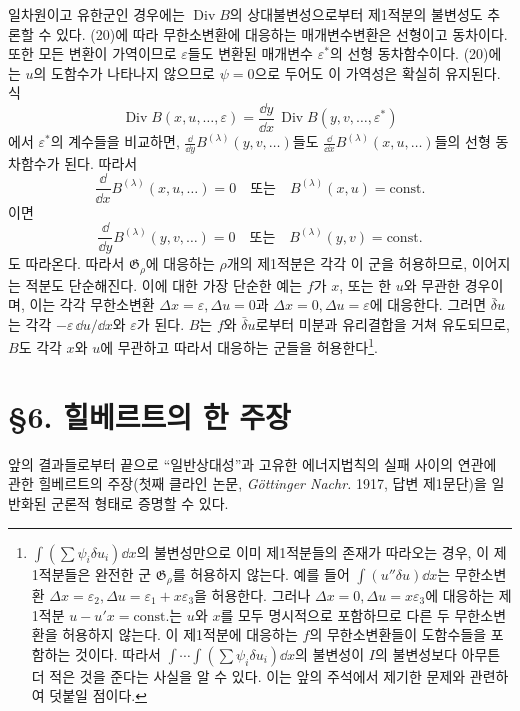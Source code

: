 일차원이고 유한군인 경우에는 \(\operatorname{Div}B\)의 상대불변성으로부터 제1적분의 불변성도 추론할 수 있다. (20)에 따라 무한소변환에 대응하는 매개변수변환은 선형이고 동차이다. 또한 모든 변환이 가역이므로 \(\varepsilon\)들도 변환된 매개변수 \(\varepsilon^*\)의 선형 동차함수이다. (20)에는 \(u\)의 도함수가 나타나지 않으므로 \(\psi=0\)으로 두어도 이 가역성은 확실히 유지된다. 식
\[
\operatorname{Div}B(x,u,\ldots,\varepsilon)
=\frac{\dd y}{\dd x}\,
\operatorname{Div}B(y,v,\ldots,\varepsilon^*)
\]
에서 \(\varepsilon^*\)의 계수들을 비교하면, \(\frac{\dd}{\dd y}B^{(\lambda)}(y,v,\ldots)\)들도 \(\frac{\dd}{\dd x}B^{(\lambda)}(x,u,\ldots)\)들의 선형 동차함수가 된다. 따라서
\[
\frac{\dd}{\dd x}B^{(\lambda)}(x,u,\ldots)=0
\quad\text{또는}\quad
B^{(\lambda)}(x,u)=\mathrm{const.}
\]
이면
\[
\frac{\dd}{\dd y}B^{(\lambda)}(y,v,\ldots)=0
\quad\text{또는}\quad
B^{(\lambda)}(y,v)=\mathrm{const.}
\]
도 따라온다. 따라서 \(\mathfrak G_\rho\)에 대응하는 \(\rho\)개의 제1적분은 각각 이 군을 허용하므로, 이어지는 적분도 단순해진다. 이에 대한 가장 단순한 예는 \(f\)가 \(x\), 또는 한 \(u\)와 무관한 경우이며, 이는 각각 무한소변환 \(\Delta x=\varepsilon,\Delta u=0\)과 \(\Delta x=0,\Delta u=\varepsilon\)에 대응한다. 그러면 \(\bar\delta u\)는 각각 \(-\varepsilon\,\dd u/\dd x\)와 \(\varepsilon\)가 된다. \(B\)는 \(f\)와 \(\bar\delta u\)로부터 미분과 유리결합을 거쳐 유도되므로, \(B\)도 각각 \(x\)와 \(u\)에 무관하고 따라서 대응하는 군들을 허용한다\footnote{\(\int(\sum\psi_i\delta u_i)\dd x\)의 불변성만으로 이미 제1적분들의 존재가 따라오는 경우, 이 제1적분들은 완전한 군 \(\mathfrak G_\rho\)를 허용하지 않는다. 예를 들어 \(\int(u''\delta u)\dd x\)는 무한소변환 \(\Delta x=\varepsilon_2,\Delta u=\varepsilon_1+x\varepsilon_3\)을 허용한다. 그러나 \(\Delta x=0,\Delta u=x\varepsilon_3\)에 대응하는 제1적분 \(u-u'x=\mathrm{const.}\)는 \(u\)와 \(x\)를 모두 명시적으로 포함하므로 다른 두 무한소변환을 허용하지 않는다. 이 제1적분에 대응하는 \(f\)의 무한소변환들이 도함수들을 포함하는 것이다. 따라서 \(\int\!\cdots\!\int(\sum\psi_i\delta u_i)\dd x\)의 불변성이 \(I\)의 불변성보다 아무튼 더 적은 것을 준다는 사실을 알 수 있다. 이는 앞의 주석에서 제기한 문제와 관련하여 덧붙일 점이다.}.

\bigskip
\section*{\S{}6. 힐베르트의 한 주장}

앞의 결과들로부터 끝으로 ``일반상대성''과 고유한 에너지법칙의 실패 사이의 연관에 관한 힐베르트의 주장(첫째 클라인 논문, \emph{Göttinger Nachr.} 1917, 답변 제1문단)을 일반화된 군론적 형태로 증명할 수 있다.


